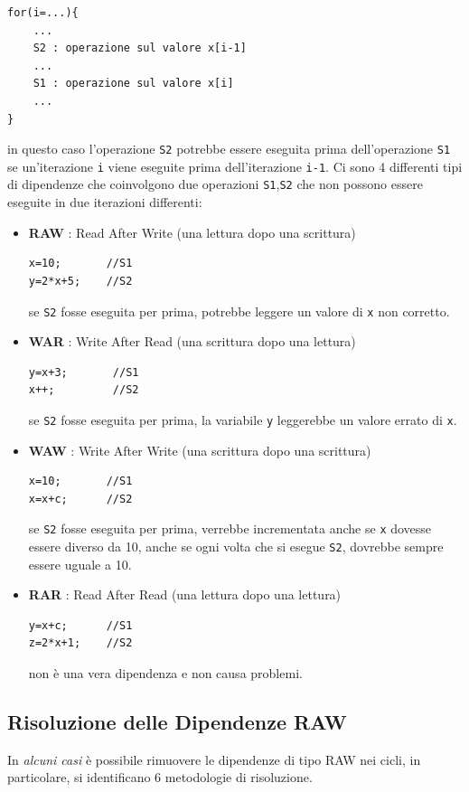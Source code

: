 \documentclass[10pt, letterpaper]{report}
\begin{document}
\begin{lstlisting}[style=CStyle]
for(i=...){
    ... 
    S2 : operazione sul valore x[i-1]
    ... 
    S1 : operazione sul valore x[i]
    ...
}
\end{lstlisting}
in questo caso l'operazione \texttt{S2} potrebbe essere eseguita prima dell'operazione \texttt{S1} se un'iterazione \texttt{i} viene eseguite prima dell'iterazione \texttt{i-1}. \acc 
Ci sono 4 differenti tipi di dipendenze che coinvolgono due operazioni \texttt{S1},\texttt{S2} che non possono essere eseguite in due iterazioni differenti:\begin{itemize}
    \item \textbf{RAW} : Read After Write (una lettura dopo una scrittura)
\begin{lstlisting}[style=CStyle]
x=10;       //S1
y=2*x+5;    //S2
\end{lstlisting}
    se \texttt{S2} fosse eseguita per prima, potrebbe leggere un valore di \texttt{x} non corretto.
    \item \textbf{WAR} : Write After Read (una scrittura dopo una lettura)
\begin{lstlisting}[style=CStyle]
y=x+3;       //S1
x++;         //S2
\end{lstlisting}
    se \texttt{S2} fosse eseguita per prima, la variabile \texttt{y} leggerebbe un valore errato di \texttt{x}.
    \item \textbf{WAW} : Write After Write (una scrittura dopo una scrittura)
\begin{lstlisting}[style=CStyle]
x=10;       //S1
x=x+c;      //S2
\end{lstlisting}
        se \texttt{S2} fosse eseguita per prima, verrebbe incrementata anche se \texttt{x} dovesse essere diverso da 10, anche se ogni volta che si esegue \texttt{S2}, dovrebbe sempre essere uguale a 10.
    \item \textbf{RAR} : Read After Read (una lettura dopo una lettura)
\begin{lstlisting}[style=CStyle]
y=x+c;      //S1
z=2*x+1;    //S2
\end{lstlisting}
non è una vera dipendenza e non causa problemi.
\end{itemize}
\subsection{Risoluzione delle Dipendenze RAW}
In \textit{alcuni casi} è possibile rimuovere le dipendenze di tipo RAW nei cicli, in particolare, si identificano 6 metodologie di risoluzione. 
\end{document}
